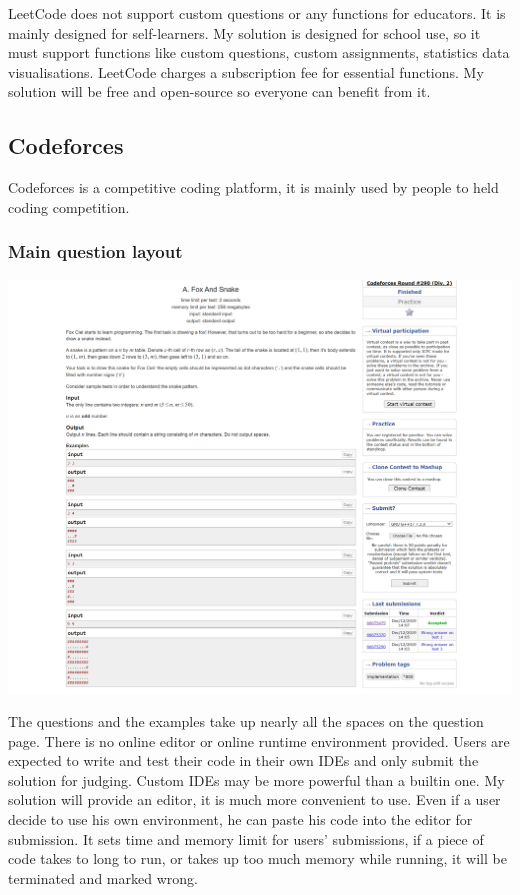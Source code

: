 \documentclass[a4paper]{report}
\begin{document}
LeetCode does not support custom questions or any functions for educators. It is mainly designed for self-learners. My solution is designed for school use, so it must support functions like custom questions, custom assignments, statistics data visualisations. LeetCode charges a subscription fee for essential functions. My solution will be free and open-source so everyone can benefit from it.

\subsection{Codeforces}

Codeforces is a competitive coding platform, it is mainly used by people to held coding competition.

\subsubsection{Main question layout}

\includegraphics[width=\linewidth]{Problem-A-Codeforces}

The questions and the examples take up nearly all the spaces on the question page. There is no online editor or online runtime environment provided. Users are expected to write and test their code in their own IDEs and only submit the solution for judging. Custom IDEs may be more powerful than a builtin one. My solution will provide an editor, it is much more convenient to use. Even if a user decide to use his own environment, he can paste his code into the editor for submission. It sets time and memory limit for users' submissions, if a piece of code takes to long to run, or takes up too much memory while running, it will be terminated and marked wrong.
\end{document}
